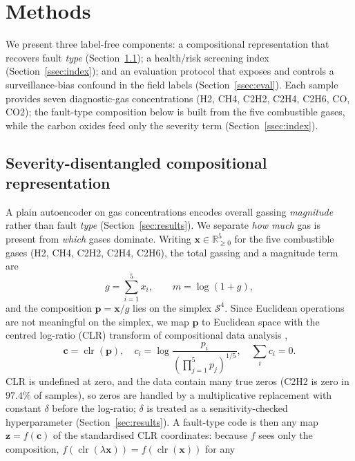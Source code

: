 \section{Methods}
\label{sec:method}

We present three label-free components: a compositional representation that recovers fault
\emph{type} (Section~\ref{ssec:sdcae}); a health/risk screening index (Section~\ref{ssec:index});
and an evaluation protocol that exposes and controls a surveillance-bias confound in the field
labels (Section~\ref{ssec:eval}). Each sample provides seven diagnostic-gas concentrations
(H2, CH4, C2H2, C2H4, C2H6, CO, CO2); the fault-type composition below is built from the five
combustible gases, while the carbon oxides feed only the severity term (Section~\ref{ssec:index}).

\subsection{Severity-disentangled compositional representation}
\label{ssec:sdcae}
A plain autoencoder on gas concentrations encodes overall gassing \emph{magnitude} rather than
fault \emph{type} (Section~\ref{sec:results}). We separate \emph{how much} gas is present from
\emph{which} gases dominate. Writing $\mathbf{x}\in\mathbb{R}^{5}_{\ge 0}$ for the five combustible
gases (H2, CH4, C2H2, C2H4, C2H6), the total gassing and a magnitude term are
\begin{equation}
g = \sum_{i=1}^{5} x_i, \qquad m = \log(1+g),
\end{equation}
and the composition $\mathbf{p} = \mathbf{x}/g$ lies on the simplex $\mathcal{S}^{4}$. Since
Euclidean operations are not meaningful on the simplex, we map $\mathbf{p}$ to Euclidean space
with the centred log-ratio (CLR) transform of compositional data analysis
\cite{aitchison1982coda},
\begin{equation}
\mathbf{c} = \operatorname{clr}(\mathbf{p}), \quad
c_i = \log\!\frac{p_i}{\left(\prod_{j=1}^{5} p_j\right)^{1/5}},
\quad \textstyle\sum_i c_i = 0 .
\end{equation}
CLR is undefined at zero, and the data contain many true zeros (C2H2 is zero in $97.4\%$ of
samples), so zeros are handled by a multiplicative replacement with constant $\delta$ before the
log-ratio; $\delta$ is treated as a sensitivity-checked hyperparameter
(Section~\ref{sec:results}). A fault-type code is then any map $\mathbf{z}=f(\mathbf{c})$ of the
standardised CLR coordinates: because $f$ sees only the composition,
$f(\operatorname{clr}(\lambda\mathbf{x})) = f(\operatorname{clr}(\mathbf{x}))$ for any
